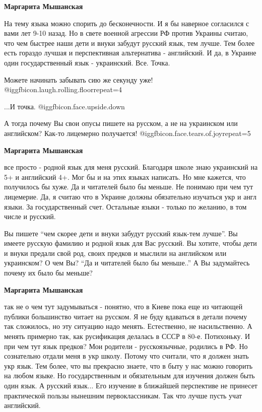 \begin{itemize}
\begin{itemize}
\begin{itemize} %
\textbf{Маргарита Мышанская} 

На тему языка можно спорить до бесконечности. И я бы наверное согласился с вами
лет 9-10 назад. Но в свете военной агрессии РФ против Украины считаю, что чем
быстрее наши дети и внуки забудут русский язык, тем лучше. Тем более есть
гораздо лучшая и перспективная альтернатива - английский. И да, в Украине один
государственный язык - украинский. Все. Точка.

\end{itemize} %

Можете начинать забывать сию же секунду уже! @igg{fbicon.laugh.rolling.floor}{repeat=4} 

...И точка. @igg{fbicon.face.upside.down} 


А тогда почему Вы свои опусы пишете на русском, а не на украинском или
английском? Как-то лицемерно получается! @igg{fbicon.face.tears.of.joy}{repeat=5} 

\begin{itemize} %
\textbf{Маргарита Мышанская} 

все просто - родной язык для меня русский. Благодаря школе знаю украинский на
5+ и английский 4+. Мог бы и на этих языках написать. Но мне кажется, что
получилось бы хуже. Да и читателей было бы меньше. Не понимаю при чем тут
лицемерие. Да, я считаю что в Украине должны обязательно изучаться укр и англ
языки. За государственный счет. Остальные языки - только по желанию, в том
числе и русский.

\end{itemize} %


Вы пишете \enquote{чем скорее дети и внуки забудут русский язык-тем лучше}. Вы имеете
русскую фамилию и родной язык для Вас русский. Вы хотите, чтобы дети и внуки
предали свой род, своих предков и мыслили на английском или украинском? О чем
Вы? \enquote{Да и читателей было бы меньше..} А Вы задумайтесь почему их было бы меньше?

\begin{itemize} %
\textbf{Маргарита Мышанская} 

так не о чем тут задумываться - понятно, что в Киеве пока еще из читающей
публики большинство читает на русском. Я не буду вдаваться в детали почему так
сложилось, но эту ситуацию надо менять. Естественно, не насильственно. А менять
примерно так, как русификация делалась в СССР в 80-е. Потихоньку. И при чем тут
язык предков? Мои родители - русскоязычные, родились в РФ. Но сознательно
отдали меня в укр школу. Потому что считали, что я должен знать укр язык. Тем
более, что вы прекрасно знаете, что в быту у нас можно говорить на любом языке.
Но государственным и обязательным для изучения должен быть один язык. А русский
язык... Его изучение в ближайшей перспективе не принесет практической пользы
нынешним первоклассникам. Так что лучше пусть учат английский.


\end{itemize}
\end{itemize}
\end{itemize}
